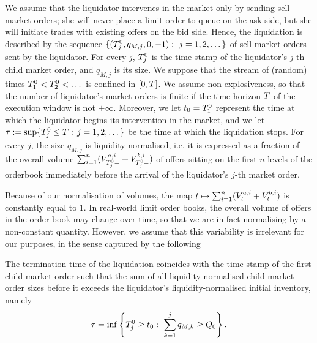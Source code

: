 \documentclass[10pt, article,table]{article}
\begin{document}
We assume that the liquidator intervenes in the market only by sending sell market orders; she will never place a limit order to queue on the ask side, but she will initiate trades with existing offers on the bid side. 
Hence, the liquidation is described by the sequence $\lbrace (\arrivalTimes[0]_j, q_{M,j},0,-1): \, \, j=1,2,\dots \rbrace$ of sell market orders sent by the liquidator. For every $j$, $\arrivalTimes[0]_j$ is the time stamp of the liquidator's $j$-th child market order, and $q_{M,j}$ is its size. 
We suppose that the stream of (random) times $\arrivalTimes[0]_1 < \arrivalTimes[0]_2 < \dots$ is confined in $\timeWindow$. We assume non-explosiveness, so that the number of liquidator's market orders is finite if the time horizon $\timeHorizon$ of the execution window is not $+\infty$. Moreover, we let $\initialTime = \arrivalTimes[0]_1$ represent the time at which the liquidator begins its intervention in the market, and we let $\terminationTime:=\sup\lbrace\arrivalTimes[0]_j\leq\timeHorizon: \, j=1,2,\dots\rbrace$ be the time at which the liquidation stops. 
For every $j$, the size $q_{M,j}$ is liquidity-normalised, i.e. it is expressed as a fraction of the overall volume $\sum_{i=1}^{n}(\nthBestAskVolume[i]_{\arrivalTimes[0]_j-} + \nthBestBidVolume[i]_{\arrivalTimes[0]_j-})$ of offers sitting on the first $n$ levels of the orderbook immediately before the arrival of the liquidator's $j$-th market order.

Because of our normalisation of volumes, the map  $t\mapsto \sum_{i=1}^{n}(\nthBestAskVolume[i]_t +\nthBestBidVolume[i]_t)$ is constantly equal to $1$. In real-world limit order books, the overall volume of offers in the order book may change over time, so that we are in fact normalising by a non-constant quantity. However, we assume that this variability is irrelevant for our purposes, in the sense captured by the following 
\begin{assumption}\label{assumption.termination-time_of_liquidation}
 The termination time of the liquidation coincides with the time stamp of the first child market order such that the sum of all liquidity-normalised child market order sizes before it  exceeds the liquidator's liquidity-normalised initial inventory, namely
 \begin{equation*}
\terminationTime = \inf\left\lbrace \arrivalTimes[0]_j \geq \initialTime : \, \, 
 \sum_{k=1}^{j} q_{M,k} \geq \metaorderSize \right\rbrace.
 \end{equation*}
\end{assumption}
\end{document}
